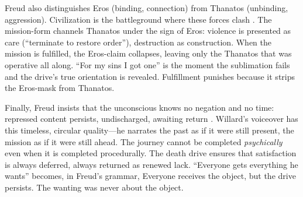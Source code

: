 Freud also distinguishes Eros (binding, connection) from Thanatos (unbinding, aggression). 
Civilization is the battleground where these forces clash \parencite[pp.~81--92]{FreudCivilization1961}. 
The mission-form channels Thanatos under the sign of Eros: violence is presented as care 
(``terminate to restore order''), destruction as construction. When the mission is fulfilled, 
the Eros-claim collapses, leaving only the Thanatos that was operative all along. ``For my 
sins I got one'' is the moment the sublimation fails and the drive's true orientation is 
revealed. Fulfillment punishes because it strips the Eros-mask from Thanatos.

Finally, Freud insists that the unconscious knows no negation and no time: repressed content 
persists, undischarged, awaiting return \parencite[pp.~166--171]{FreudBeyond1955}. Willard's 
voiceover has this timeless, circular quality---he narrates the past as if it were still 
present, the mission as if it were still ahead. The journey cannot be completed 
\emph{psychically} even when it is completed procedurally. The death drive ensures that 
satisfaction is always deferred, always returned as renewed lack. ``Everyone gets everything 
he wants'' becomes, in Freud's grammar, Everyone receives the object, but the drive persists. 
The wanting was never about the object.

